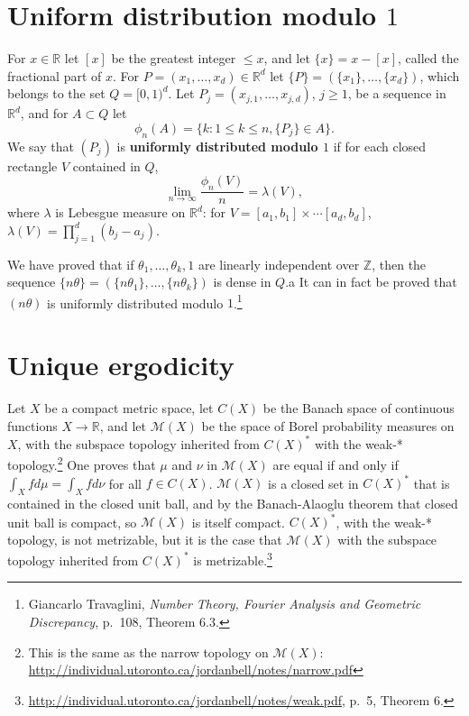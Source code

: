 \documentclass{article}
\theoremstyle{definition}
\begin{document}
\section{Uniform distribution modulo $1$}
For $x \in \mathbb{R}$ let $[x]$ be the greatest integer $\leq x$, and let
$\{x\}=x-[x]$, called the fractional part of $x$.
For $P=(x_1,\ldots,x_d) \in \mathbb{R}^d$ let
$\{P\} = (\{x_1\},\ldots,\{x_d\})$, which belongs to
the set $Q=[0,1)^d$. 
Let $P_j=(x_{j,1},\ldots,x_{j,d})$, $j \geq 1$, be a sequence in $\mathbb{R}^d$, and
for $A \subset Q$ let
\[
\phi_n(A) = \{k: 1 \leq k \leq n, \{P_j\} \in A\}.
\]
We say that $(P_j)$ is \textbf{uniformly distributed modulo $1$} if 
for each closed rectangle $V$ contained in $Q$,
\[
\lim_{n \to \infty} \frac{\phi_n(V)}{n} = \lambda(V),
\]
where $\lambda$ is Lebesgue measure on $\mathbb{R}^d$: for
$V=[a_1,b_1] \times \cdots [a_d,b_d]$, $\lambda(V) = \prod_{j=1}^d (b_j-a_j)$. 

We have proved that if $\theta_1,\ldots,\theta_k,1$ are linearly independent over $\mathbb{Z}$, 
then the sequence $\{n \theta\} = (\{n\theta_1\},\ldots,\{n\theta_k\})$ is dense in $Q$.a
It can in fact be proved that $(n\theta)$ is uniformly distributed modulo $1$.\footnote{Giancarlo Travaglini,
{\em Number Theory, Fourier Analysis and Geometric Discrepancy},
p.~108, Theorem 6.3.}


\section{Unique ergodicity}
Let $X$ be a compact metric space,
let $C(X)$ be the Banach space of continuous functions $X \to \mathbb{R}$, 
 and let $\mathscr{M}(X)$ be the space of Borel probability measures on $X$, with the subspace topology inherited
 from $C(X)^*$ with the weak-* topology.\footnote{This is the same as the narrow topology on $\mathscr{M}(X)$: \url{http://individual.utoronto.ca/jordanbell/notes/narrow.pdf}}
 One proves that $\mu$ and $\nu$ in $\mathscr{M}(X)$ are equal if and only if $\int_X f d\mu = \int_X f d\nu$ for all
$f \in C(X)$.
$\mathscr{M}(X)$ is a closed set in $C(X)^*$ that is contained in the closed unit ball, and  by the Banach-Alaoglu
theorem that closed unit ball is compact, so $\mathscr{M}(X)$ is itself compact. $C(X)^*$, with the weak-* topology, is not metrizable, 
but it is the case that $\mathscr{M}(X)$ with the subspace topology inherited from $C(X)^*$ is metrizable.\footnote{\url{http://individual.utoronto.ca/jordanbell/notes/weak.pdf},
p.~5, Theorem 6.}
\end{document}
